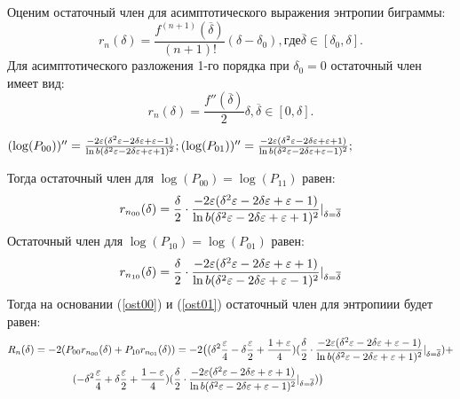 ﻿\documentclass[a4paper,12pt]{article}
\theoremstyle{plain}
\begin{document}
Оценим остаточный член для асимптотического выражения энтропии биграммы:
\begin{equation}
	r_n(\delta)=\frac{f^{(n+1)}(\overline{\delta})}{(n+1)!}(\delta-\delta_0), где \overline{\delta} \in [\delta_0, \delta].
\end{equation}
Для асимптотического разложения 1-го порядка при $\delta_0=0$ остаточный член имеет вид:\\
\begin{equation}
	r_n(\delta)=\frac{f''(\overline{\delta})}{2}\delta,\overline{\delta} \in [0, \delta].
\end{equation}
\begin{center}
	$(\log(P_{00}))''=\frac{-2\varepsilon(\delta^2\varepsilon-2\delta\varepsilon+\varepsilon-1)}{\ln b (\delta^2\varepsilon-2\delta\varepsilon+\varepsilon+1)^2};\newline
(\log(P_{01}))''=\frac{-2\varepsilon(\delta^2\varepsilon-2\delta\varepsilon+\varepsilon+1)}{\ln b (\delta^2\varepsilon-2\delta\varepsilon+\varepsilon-1)^2};\newline$

\end{center}
Тогда остаточный член для $\log(P_{00})=\log(P_{11})$ равен:\\
\begin{equation}\label{ost00}
r_{n_{00}}(\delta)=\frac{\delta}{2}\cdot \frac{-2\varepsilon(\delta^2\varepsilon-2\delta\varepsilon+\varepsilon-1)}{\ln b (\delta^2\varepsilon-2\delta\varepsilon+\varepsilon+1)^2}|_{\delta=\overline{\delta}}\newline
\end{equation}
Остаточный член для $\log(P_{10})=\log(P_{01})$ равен:\\
\begin{equation}\label{ost01}
r_{n_{10}}(\delta)=\frac{\delta}{2}\cdot \frac{-2\varepsilon(\delta^2\varepsilon-2\delta\varepsilon+\varepsilon+1)}{\ln b (\delta^2\varepsilon-2\delta\varepsilon+\varepsilon-1)^2}|_{\delta=\overline{\delta}}\newline
\end{equation}
Тогда на основании (\ref{ost00}) и (\ref{ost01}) остаточный член для энтропиии будет равен:\\
\begin{gather*}
R_n(\delta)=-2(P_{00}r_{n_{00}}(\delta)+P_{10}r_{n_{01}}(\delta))=-2\bigr((\delta^2\frac{\varepsilon}{4}-\delta\frac{\varepsilon}{2}+\frac{1+\varepsilon}{4})(\frac{\delta}{2}\cdot \frac{-2\varepsilon(\delta^2\varepsilon-2\delta\varepsilon+\varepsilon-1)}{\ln b (\delta^2\varepsilon-2\delta\varepsilon+\varepsilon+1)^2}|_{\delta=\overline{\delta}}) +\\ (-\delta^2\frac{\varepsilon}{4}+\delta\frac{\varepsilon}{2}+\frac{1-\varepsilon}{4})(\frac{\delta}{2}\cdot \frac{-2\varepsilon(\delta^2\varepsilon-2\delta\varepsilon+\varepsilon+1)}{\ln b (\delta^2\varepsilon-2\delta\varepsilon+\varepsilon-1)^2}|_{\delta=\overline{\delta}})\bigr) \newline
\end{gather*}
\end{document}
